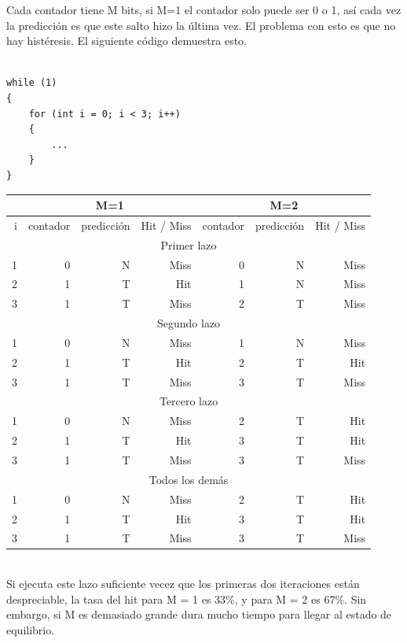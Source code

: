 \documentclass[a4paper]{article}
\begin{document}
Cada contador tiene M bits, si M=1 el contador solo puede ser 0 o 1, así cada vez la predicción es que este salto hizo la última vez. El problema con esto es que no hay histéresis. El siguiente código demuestra esto.

\begin{verbatim}

while (1)
{
    for (int i = 0; i < 3; i++)
    {
        ...
    }
}

\end{verbatim}

\begin{tabular}{| r | r r r | r r r |}
\cline{2-7}
\multicolumn{1}{c|}{} & \multicolumn{3}{c|}{M=1} & \multicolumn{3}{c|}{M=2} \\ \hline
i & contador & predicción & Hit / Miss & contador & predicción & Hit / Miss \\ \hline
\multicolumn{7}{|c|}{Primer lazo} \\ \hline
1 &     0 & N & Miss &      0 & N & Miss \\
2 &     1 & T & Hit &       1 & N & Miss \\
3 &     1 & T & Miss &      2 & T & Miss \\

\hline
\multicolumn{7}{|c|}{Segundo lazo} \\ \hline
1 &     0 & N & Miss &      1 & N & Miss \\
2 &     1 & T & Hit &       2 & T & Hit  \\
3 &     1 & T & Miss &      3 & T & Miss \\

\hline
\multicolumn{7}{|c|}{Tercero lazo} \\ \hline
1 &     0 & N & Miss &      2 & T & Hit \\
2 &     1 & T & Hit &       3 & T & Hit  \\
3 &     1 & T & Miss &      3 & T & Miss \\

\hline
\multicolumn{7}{|c|}{Todos los demás} \\ \hline
1 &     0 & N & Miss &      2 & T & Hit \\
2 &     1 & T & Hit &       3 & T & Hit  \\
3 &     1 & T & Miss &      3 & T & Miss \\

\hline
\end{tabular} \\

Si ejecuta este lazo suficiente vecez que los primeras dos iteraciones están despreciable, la tasa del hit para M = 1 es 33\%, y para M = 2 es 67\%. Sin embargo, si M es demasiado grande dura mucho tiempo para llegar al estado de equilibrio.
\end{document}
